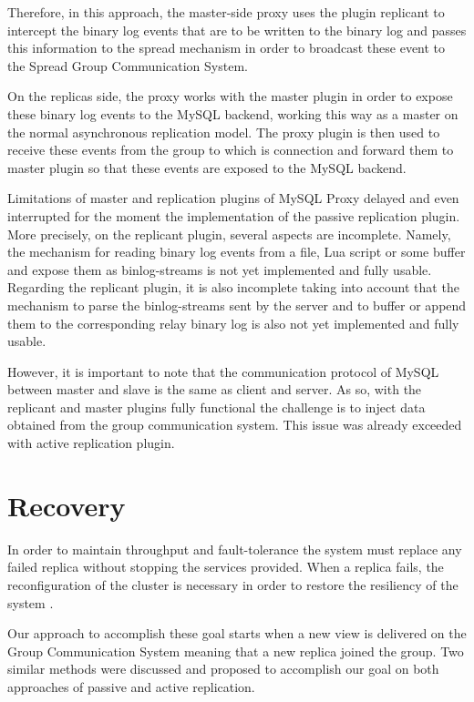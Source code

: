 Therefore, in this approach, the master-side proxy uses the plugin replicant to intercept the binary log events that are to be written to the binary log and passes this information to the spread mechanism in order to broadcast these event to the Spread Group Communication System. 
 
On the replicas side, the proxy works with the master plugin in order to expose these binary log events to the MySQL backend, working this way as a master on the normal asynchronous replication model. The proxy plugin is then used to receive these events from the group to which is connection and forward them to master plugin so that these events are exposed to the MySQL backend.

Limitations of master and replication plugins of MySQL Proxy delayed and even interrupted for the moment the implementation of the passive replication plugin. More precisely, on the replicant plugin, several aspects are incomplete. Namely, the mechanism for reading binary log events from a file, Lua script or some buffer and expose them as binlog-streams is not yet implemented and fully usable. Regarding the replicant plugin, it is also incomplete taking into account that the mechanism to parse the binlog-streams sent by the server and to buffer or append them to the corresponding relay binary log is also not yet implemented and fully usable.

However, it is important to note that the communication protocol of MySQL between master and slave is the same as client and server. As so, with the replicant and master plugins fully functional the challenge is to inject data obtained from the group communication system. This issue was already exceeded with active replication plugin.


\section{Recovery}

In order to maintain throughput and fault-tolerance the system must replace any failed replica without stopping the services provided. When a replica fails, the reconfiguration of the cluster is necessary in order to restore the resiliency of the system \cite{Vilaca:2009:CDC:1637865.1638353}.

Our approach to accomplish these goal starts when a new view is delivered on the Group Communication System meaning that a new replica joined the group. Two similar methods were discussed and proposed to accomplish our goal on both approaches of passive and active replication.

